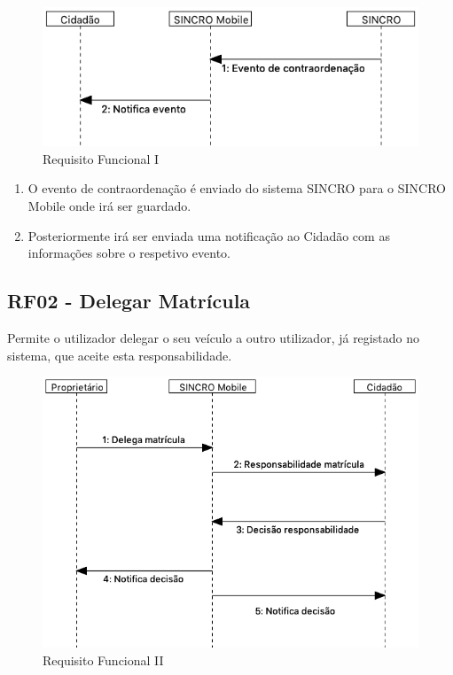 \documentclass{article}
\begin{document}
\begin{figure}
\centering
\includegraphics[scale=0.3]{./adoc_images/sequence/rf01.png}
\caption{Requisito Funcional I}
\end{figure}

\begin{enumerate}
\def\labelenumi{\arabic{enumi}.}
\item
  O evento de contraordenação é enviado do sistema SINCRO para o SINCRO
  Mobile onde irá ser guardado.\\
\item
  Posteriormente irá ser enviada uma notificação ao Cidadão com as
  informações sobre o respetivo evento.
\end{enumerate}

\hypertarget{_rf02_delegar_matr_cula}{%
\subsection{RF02 - Delegar Matrícula}\label{_rf02_delegar_matr_cula}}

Permite o utilizador delegar o seu veículo a outro utilizador, já
registado no sistema, que aceite esta responsabilidade.

\begin{figure}
\centering
\includegraphics[scale=0.3]{./adoc_images/sequence/rf02.png}
\caption{Requisito Funcional II}
\end{figure}
\end{document}
